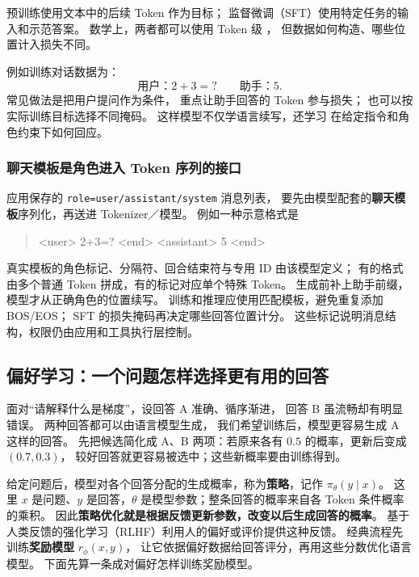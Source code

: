 预训练使用文本中的后续 Token 作为目标；
监督微调（SFT）使用特定任务的输入和示范答案。
数学上，两者都可以使用 Token 级 ，
但数据如何构造、哪些位置计入损失不同。

例如训练对话数据为：
\[
\text{用户：$2+3=?$}\qquad
\text{助手：$5$}.
\]
常见做法是把用户提问作为条件，
重点让助手回答的 Token 参与损失；
也可以按实际训练目标选择不同掩码。
这样模型不仅学语言续写，还学习
在给定指令和角色约束下如何回应。

\subsubsection*{聊天模板是角色进入 Token 序列的接口}
\label{concept:chat-template}
应用保存的 \texttt{role=user/assistant/system} 消息列表，
要先由模型配套的\textbf{聊天模板}序列化，再送进 Tokenizer／模型。
例如一种示意格式是
\begin{quote}\ttfamily\small
<user> 2+3=? <end> <assistant> 5 <end>
\end{quote}
真实模板的角色标记、分隔符、回合结束符与专用 ID 由该模型定义；
有的格式由多个普通 Token 拼成，有的标记对应单个特殊 Token。
生成前补上助手前缀，模型才从正确角色的位置续写。
训练和推理应使用匹配模板，避免重复添加 BOS/EOS；
SFT 的损失掩码再决定哪些回答位置计分。
这些标记说明消息结构，权限仍由应用和工具执行层控制。



\subsection{偏好学习：一个问题怎样选择更有用的回答}
\label{concept:rlhf}

面对“请解释什么是梯度”，设回答 A 准确、循序渐进，
回答 B 虽流畅却有明显错误。
两种回答都可以由语言模型生成，
我们希望训练后，模型更容易生成 A 这样的回答。
先把候选简化成 A、B 两项：若原来各有 $0.5$ 的概率，更新后变成 $(0.7,0.3)$，
较好回答就更容易被选中；这些新概率要由训练得到。

给定问题后，模型对各个回答分配的生成概率，称为\textbf{策略}，记作 $\pi_\theta(y\mid x)$。
这里 $x$ 是问题、$y$ 是回答，$\theta$ 是模型参数；整条回答的概率来自各 Token 条件概率的乘积。
因此\textbf{策略优化就是根据反馈更新参数，改变以后生成回答的概率}。
基于人类反馈的强化学习（RLHF）利用人的偏好或评价提供这种反馈。
经典流程先训练\label{concept:reward-model}\textbf{奖励模型} $r_\phi(x,y)$，
让它依据偏好数据给回答评分，再用这些分数优化语言模型。
下面先算一条成对偏好怎样训练奖励模型。

